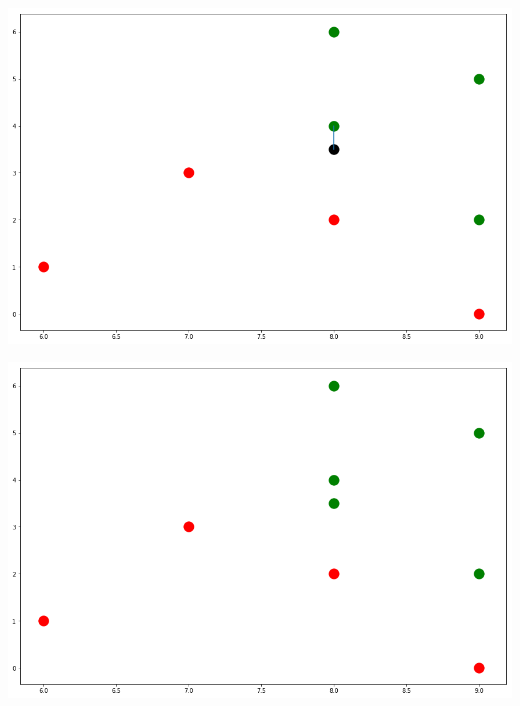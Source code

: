 \documentclass[fontsize=11pt]{scrartcl}
\newenvironment{Figure}
  {\par\medskip\noindent\minipage{\linewidth}}
  {\endminipage\par\medskip}
\begin{document}
                
                \begin{Figure}
                    \begin{minipage}[b]{.4\linewidth}
                        \includegraphics[scale=0.2]{nn5.png}
                    \end{minipage}
                    \hspace{.1\linewidth}
                    \begin{minipage}[b]{.4\linewidth}
                        \includegraphics[scale=0.2]{nn6.png}
                    \end{minipage}
                \end{Figure}
                    
\end{document}
